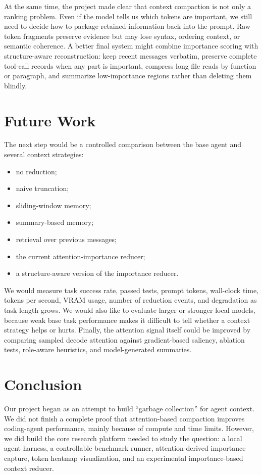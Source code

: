 \documentclass[11pt]{article}
\begin{document}
At the same time, the project made clear that context compaction is not only a
ranking problem. Even if the model tells us which tokens are important, we still
need to decide how to package retained information back into the prompt. Raw
token fragments preserve evidence but may lose syntax, ordering context, or
semantic coherence. A better final system might combine importance scoring with
structure-aware reconstruction: keep recent messages verbatim, preserve complete
tool-call records when any part is important, compress long file reads by
function or paragraph, and summarize low-importance regions rather than deleting
them blindly.

\section*{Future Work}

The next step would be a controlled comparison between the base agent and several
context strategies:

\begin{itemize}
    \item no reduction;
    \item naive truncation;
    \item sliding-window memory;
    \item summary-based memory;
    \item retrieval over previous messages;
    \item the current attention-importance reducer;
    \item a structure-aware version of the importance reducer.
\end{itemize}

We would measure task success rate, passed tests, prompt tokens, wall-clock time,
tokens per second, VRAM usage, number of reduction events, and degradation as
task length grows. We would also like to evaluate larger or stronger local
models, because weak base task performance makes it difficult to tell whether a
context strategy helps or hurts. Finally, the attention signal itself could be
improved by comparing sampled decode attention against gradient-based saliency,
ablation tests, role-aware heuristics, and model-generated summaries.

\section*{Conclusion}

Our project began as an attempt to build ``garbage collection'' for agent
context. We did not finish a complete proof that attention-based compaction
improves coding-agent performance, mainly because of compute and time limits.
However, we did build the core research platform needed to study the question:
a local agent harness, a controllable benchmark runner, attention-derived
importance capture, token heatmap visualization, and an experimental
importance-based context reducer.
\end{document}

